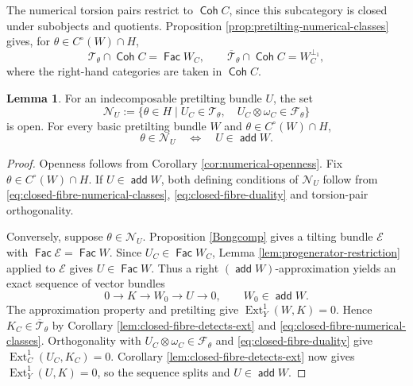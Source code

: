 \documentclass[a4paper,reqno]{amsart}
\def\E{\mathcal{E}}
\def\F{\mathcal{F}}
\def\T{\mathcal{T}}
\DeclareMathOperator{\add}{\mathsf{add}}
\DeclareMathOperator{\Fac}{\mathsf{Fac}}
\DeclareMathOperator{\Coh}{\mathsf{Coh}}
\DeclareMathOperator{\Ext}{Ext}
\theoremstyle{definition}
\newtheorem{Lem}[Thm]{Lemma}
\begin{document}
The numerical torsion pairs restrict to $\Coh C$, since this subcategory is closed under subobjects and quotients. Proposition \ref{prop:pretilting-numerical-classes} gives, for $\theta\in C^\circ(W)\cap H$,
\begin{equation}\label{eq:closed-fibre-numerical-classes}
\T_\theta\cap\Coh C=\Fac W_C,
\qquad
\overline{\T}_\theta\cap\Coh C=W_C^{\perp_1},
\end{equation}
where the right-hand categories are taken in $\Coh C$.

\begin{Lem}\label{lem:open-summand-detection}
For an indecomposable pretilting bundle $U$, the set
\[
\mathcal N_U:=\{\theta\in H\mid
U_C\in\T_\theta,\quad U_C\otimes\omega_C\in\F_\theta\}
\]
is open. For every basic pretilting bundle $W$ and $\theta\in C^\circ(W)\cap H$,
\begin{equation}\label{eq:open-summand-detection}
\theta\in\mathcal N_U
\quad\Longleftrightarrow\quad U\in\add W.
\end{equation}
\end{Lem}
\begin{proof}
Openness follows from Corollary \ref{cor:numerical-openness}. Fix
$\theta\in C^\circ(W)\cap H$. If $U\in\add W$, both defining conditions
of $\mathcal N_U$ follow from \eqref{eq:closed-fibre-numerical-classes},
\eqref{eq:closed-fibre-duality} and torsion-pair orthogonality.

Conversely, suppose $\theta\in\mathcal N_U$. Proposition \ref{Bongcomp}
gives a tilting bundle $\E$ with $\Fac\E=\Fac W$. Since
$U_C\in\Fac W_C$, Lemma \ref{lem:progenerator-restriction} applied to
$\E$ gives $U\in\Fac W$. Thus a right $(\add W)$-approximation yields
an exact sequence of vector bundles
\[
0\longrightarrow K\longrightarrow W_0\longrightarrow U\longrightarrow0,
\qquad W_0\in\add W.
\]
The approximation property and pretilting give $\Ext_Y^1(W,K)=0$.
Hence $K_C\in\overline{\T}_\theta$ by Corollary
\ref{lem:closed-fibre-detects-ext} and
\eqref{eq:closed-fibre-numerical-classes}. Orthogonality with
$U_C\otimes\omega_C\in\F_\theta$ and
\eqref{eq:closed-fibre-duality} give $\Ext_C^1(U_C,K_C)=0$.
Corollary \ref{lem:closed-fibre-detects-ext} now gives
$\Ext_Y^1(U,K)=0$, so the sequence splits and $U\in\add W$.
\end{proof}
\end{document}
